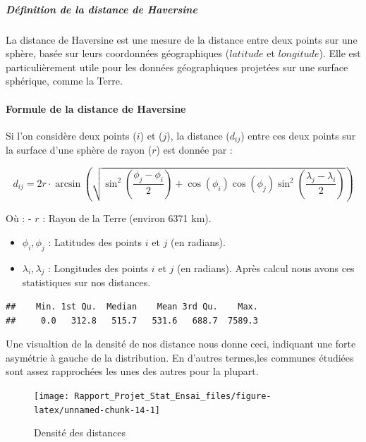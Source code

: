 \documentclass[
]{article}
\begin{document}
\subparagraph{Définition de la distance de
Haversine}\label{duxe9finition-de-la-distance-de-haversine}

La distance de Haversine est une mesure de la distance entre deux points
sur une sphère, basée sur leurs coordonnées géographiques (\(latitude\)
et \(longitude\)). Elle est particulièrement utile pour les données
géographiques projetées sur une surface sphérique, comme la Terre.

\paragraph{Formule de la distance de
Haversine}\label{formule-de-la-distance-de-haversine}

Si l'on considère deux points (\(i\)) et (\(j\)), la distance
(\(d_{ij}\)) entre ces deux points sur la surface d'une sphère de rayon
(\(r\)) est donnée par :

\[
 d_{ij} = 2r \cdot \arcsin\left(\sqrt{\sin^2\left(\frac{\phi_j - \phi_i}{2}\right) + \cos(\phi_i)\cos(\phi_j)\sin^2\left(\frac{\lambda_j - \lambda_i}{2}\right)}\right)
\]

Où : - \(r\) : Rayon de la Terre (environ 6371 km).

\begin{itemize}
\item
  \(\phi_i, \phi_j\) : Latitudes des points \(i\) et \(j\) (en radians).
\item
  \(\lambda_i, \lambda_j\) : Longitudes des points \(i\) et \(j\) (en
  radians). Après calcul nous avons ces statistiques sur nos distances.
\end{itemize}

\begin{verbatim}
##    Min. 1st Qu.  Median    Mean 3rd Qu.    Max. 
##     0.0   312.8   515.7   531.6   688.7  7589.3
\end{verbatim}

Une visualtion de la densité de nos distance nous donne ceci, indiquant
une forte asymétrie à gauche de la distribution. En d'autres termes,les
communes étudiées sont assez rapprochées les unes des autres pour la
plupart.

\begin{figure}

{\centering \texttt{[image: Rapport\_Projet\_Stat\_Ensai\_files/figure-latex/unnamed-chunk-14-1]} 

}

\caption{Densité des distances}\label{fig:unnamed-chunk-14}
\end{figure}
\end{document}
